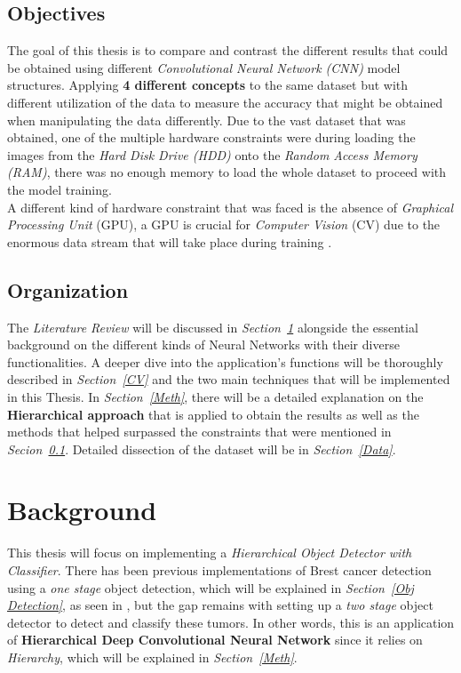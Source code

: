 \documentclass[12pt]{extarticle}
\begin{document}
	\subsection{Objectives}\label{Obj}
	The goal of this thesis is to compare and contrast the different results that could be obtained using different \emph{Convolutional Neural Network (CNN)} model structures. Applying \textbf{4 different concepts} to the same dataset but with different utilization of the data to measure the accuracy that might be obtained when manipulating the data differently. Due to the vast dataset that was obtained, one of the multiple hardware constraints were during loading the images from the \emph{Hard Disk Drive (HDD)} onto the \emph{Random Access Memory (RAM)}, there was no enough memory to load the whole dataset to proceed with the model training. \\[5mm]
	A different kind of hardware constraint that was faced is the absence of \emph{Graphical Processing Unit} (GPU), a GPU is crucial for \emph{Computer Vision} (CV) due to the enormous data stream that will take place during training \cite{GPU} \cite{GPU}.
	\subsection{Organization}\label{Org}
	The \emph{Literature Review} will be discussed in \emph{Section~\ref{Lit. Rev.}} alongside the essential background on the different kinds of Neural Networks with their diverse functionalities. A deeper dive into the application's functions will be thoroughly described in \emph{Section~\ref{CV}} and the two main techniques that will be implemented in this Thesis. In \emph{Section~\ref{Meth}}, there will be a detailed explanation on the \textbf{Hierarchical approach} that is applied to obtain the results as well as the methods that helped surpassed the constraints that were mentioned in \emph{Secion~\ref{Obj}}. Detailed dissection of the dataset will be in \emph{Section~\ref{Data}}.
	\newpage
	\section{Background}\label{Lit. Rev.}
	This thesis will focus on implementing a \emph{Hierarchical Object Detector with Classifier}. There has been previous implementations of Brest cancer detection using a \emph{one stage} object detection, which will be explained in \emph{Section~\ref{Obj Detection}}, as seen in \cite{one_shot}, but the gap remains with setting up a \emph{two stage} object detector to detect and classify these tumors. In other words, this is an application of \textbf{Hierarchical Deep Convolutional Neural Network} since it relies on \emph{Hierarchy}, which will be explained in \emph{Section~\ref{Meth}}.
\end{document}
